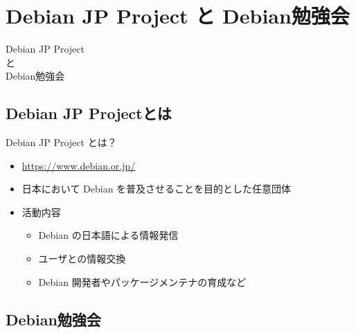 

\section{Debian JP Project と Debian勉強会}


\begin{frame}
  \begin{center}\Huge{Debian JP Project\\と\\Debian勉強会}\end{center}
\end{frame}

\subsection{Debian JP Projectとは}
  
\begin{frame}{Debian JP Project とは？}

\begin{itemize}
  \item \url{https://www.debian.or.jp/}
  \item 日本において Debian を普及させることを目的とした任意団体
  \item 活動内容
  \begin{itemize}
    \item Debian の日本語による情報発信
    \item ユーザとの情報交換
    \item Debian 開発者やパッケージメンテナの育成など
  \end{itemize}
\end{itemize}

\end{frame}


\subsection{Debian勉強会}


